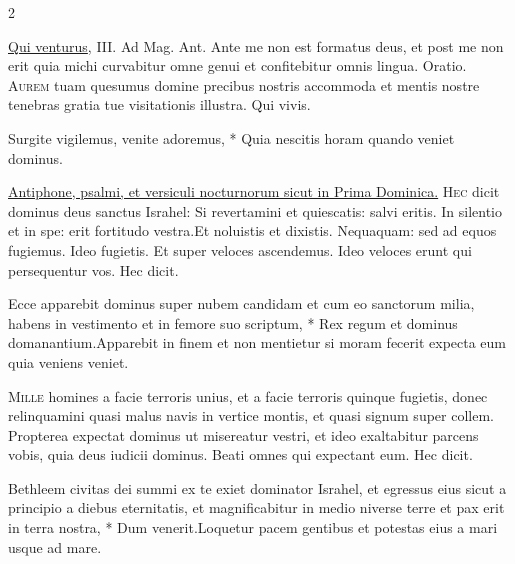 \begin{multicols*}{2}
{\color{Red} }
\par {} \R \hyperlink{qui-venturus}{Qui venturus}, {\color{Red} III. Ad Mag. Ant.} Ante me non est formatus deus, et post me non erit quia michi curvabitur omne genui et confitebitur omnis lingua. {\color{Red} Oratio.}
\lettrine[lines=2]{\zallmancaps \color{Red} A}{urem} tuam quesumus domine precibus nostris accommoda et mentis nostre tenebras gratia tue visitationis illustra. Qui vivis.
\begin{invitatory}
{Surgite vigilemus, venite adoremus, * Quia nescitis horam quando veniet dominus.}
\end{invitatory}
\newline \ul{Antiphone, psalmi, et versiculi nocturnorum sicut in Prima Dominica.}
\lettrine[lines=2]{\zallmancaps \color{Blue} H}{ec} dicit dominus deus sanctus Israhel: Si revertamini et quiescatis: salvi eritis. In silentio et in spe: erit fortitudo vestra.Et noluistis et dixistis. Nequaquam: sed ad equos fugiemus. Ideo fugietis. Et super veloces ascendemus. Ideo veloces erunt qui persequentur vos. Hec dicit.
\begin{responsory}
{Ecce apparebit dominus super nubem candidam et cum eo sanctorum milia, habens in vestimento et in femore suo scriptum, * Rex regum et dominus domanantium.}{Apparebit in finem et non mentietur si moram fecerit expecta eum quia veniens veniet.}
\end{responsory}%
\lettrine[lines=2]{\zallmancaps \color{Red} M}{ille} homines a facie terroris unius, et a facie terroris quinque fugietis, donec relinquamini quasi malus navis in vertice montis, et quasi signum super collem. Propterea expectat dominus ut misereatur vestri, et ideo exaltabitur parcens vobis, quia deus iudicii dominus. Beati omnes qui expectant eum. Hec dicit.
\begin{responsory}
{Bethleem civitas dei summi ex te exiet dominator Israhel, et egressus eius sicut a principio a diebus eternitatis, et magnificabitur in medio niverse terre et pax erit in terra nostra, * Dum venerit.}{Loquetur pacem gentibus et potestas eius a mari usque ad mare.}
\end{responsory}%

\end{multicols*}
